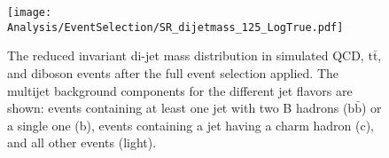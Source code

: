 \begin{figure}[h!]
\begin{center}
\texttt{[image: Analysis/EventSelection/SR\_dijetmass\_125\_LogTrue.pdf]}
\end{center}
\caption{The reduced invariant di-jet mass distribution in simulated QCD, $\mathrm{t\bar{t}}$, and diboson events after the full event selection applied. The multijet background components for the different jet flavors are shown: events containing at least one jet with two B hadrons ($\mathrm{b\bar{b}}$) or a single one (b), events containing a jet having a charm hadron (c), and all other events (light).}
\label{fig:MCcomposition}
\end{figure}


